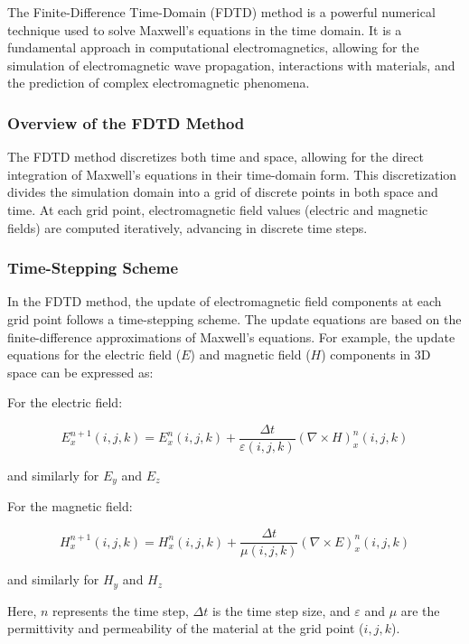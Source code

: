 \documentclass[11pt, a4paper, titlepage]{article}
\begin{document}
The Finite-Difference Time-Domain (FDTD) method is a powerful numerical technique used to solve Maxwell's equations in the time domain. It is a fundamental approach in computational electromagnetics, allowing for the simulation of electromagnetic wave propagation, interactions with materials, and the prediction of complex electromagnetic phenomena.

\subsubsection{Overview of the FDTD Method}

The FDTD method discretizes both time and space, allowing for the direct integration of Maxwell's equations in their time-domain form. This discretization divides the simulation domain into a grid of discrete points in both space and time. At each grid point, electromagnetic field values (electric and magnetic fields) are computed iteratively, advancing in discrete time steps.

\subsubsection{Time-Stepping Scheme}

In the FDTD method, the update of electromagnetic field components at each grid point follows a time-stepping scheme. The update equations are based on the finite-difference approximations of Maxwell's equations. For example, the update equations for the electric field (\(E\)) and magnetic field (\(H\)) components in 3D space can be expressed as:

\begin{center} For the electric field: \end{center}
\[
E_x^{n+1}(i,j,k) = E_x^n(i,j,k) + \frac{\Delta t}{\varepsilon(i,j,k)} \left(\nabla \times H\right)_x^n(i,j,k)
\]
\begin{center}and similarly for  $E_y$ and $E_z$\end{center}



\begin{center}For the magnetic field:\end{center}
\[
H_x^{n+1}(i,j,k) = H_x^n(i,j,k) + \frac{\Delta t}{\mu(i,j,k)} \left(\nabla \times E\right)_x^n(i,j,k)
\]
 \begin{center}and similarly for $H_y$ and $H_z$\end{center}
 
 
Here, \(n\) represents the time step, \(\Delta t\) is the time step size, and \(\varepsilon\) and \(\mu\) are the permittivity and permeability of the material at the grid point (\(i, j, k\)).
\end{document}
